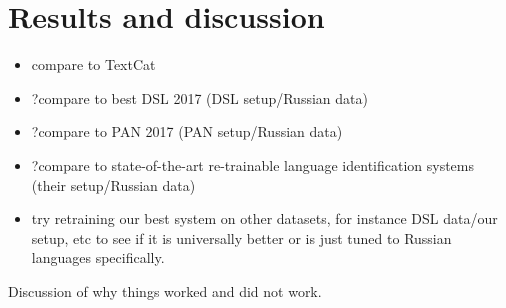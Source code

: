 \chapter{Results and discussion}

\begin{itemize}
    \item compare to TextCat
    \item ?compare to best DSL 2017 (DSL setup/Russian data)
    \item ?compare to PAN 2017 (PAN setup/Russian data)
    \item ?compare to state-of-the-art re-trainable language identification systems (their setup/Russian data)
    \item try retraining our best system on other datasets, for instance DSL data/our setup, etc to see if it is universally better or is just tuned to Russian languages specifically.
\end{itemize}

Discussion of why things worked and did not work. 
